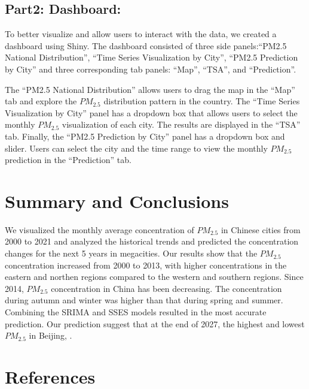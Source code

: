 \documentclass[
  12pt,
]{article}
\begin{document}
\newpage

\hypertarget{part2-dashboard}{%
\subsection{Part2: Dashboard:}\label{part2-dashboard}}

To better visualize and allow users to interact with the data, we
created a dashboard using Shiny. The dashboard consisted of three side
panels:``PM2.5 National Distribution'', ``Time Series Visualization by
City'', ``PM2.5 Prediction by City'' and three corresponding tab panels:
``Map'', ``TSA'', and ``Prediction''.

The ``PM2.5 National Distribution'' allows users to drag the map in the
``Map'' tab and explore the \(PM_{2.5}\) distribution pattern in the
country. The ``Time Series Visualization by City'' panel has a dropdown
box that allows users to select the monthly \(PM_{2.5}\) visualization
of each city. The results are displayed in the ``TSA'' tab. Finally, the
``PM2.5 Prediction by City'' panel has a dropdown box and slider. Users
can select the city and the time range to view the monthly \(PM_{2.5}\)
prediction in the ``Prediction'' tab.

\newpage

\hypertarget{summary-and-conclusions}{%
\section{Summary and Conclusions}\label{summary-and-conclusions}}

We visualized the monthly average concentration of \(PM_{2.5}\) in
Chinese cities from 2000 to 2021 and analyzed the historical trends and
predicted the concentration changes for the next 5 years in megacities.
Our results show that the \(PM_{2.5}\) concentration increased from 2000
to 2013, with higher concentrations in the eastern and northen regions
compared to the western and southern regions. Since 2014, \(PM_{2.5}\)
concentration in China has been decreasing. The concentration during
autumn and winter was higher than that during spring and summer.
Combining the SRIMA and SSES models resulted in the most accurate
prediction. Our prediction suggest that at the end of 2027, the highest
and lowest \(PM_{2.5}\) in Beijing, .

\newpage

\hypertarget{references}{%
\section*{References}\label{references}}
\end{document}
